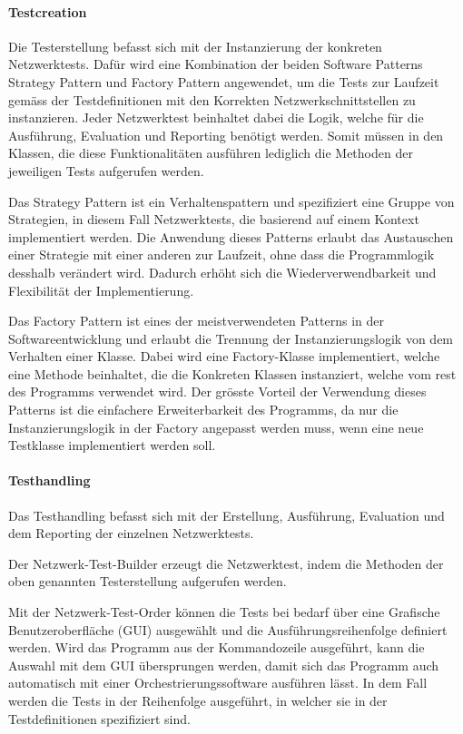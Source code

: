 \documentclass[]{subfiles}
\begin{document}
\newpage

\paragraph{Testcreation}
Die Testerstellung befasst sich mit der Instanzierung der konkreten Netzwerktests.
Dafür wird eine Kombination der beiden Software Patterns Strategy Pattern und Factory Pattern
angewendet, um die Tests zur Laufzeit gemäss der Testdefinitionen mit den Korrekten 
Netzwerkschnittstellen zu instanzieren. 
Jeder Netzwerktest beinhaltet dabei die Logik, welche für die Ausführung, Evaluation und 
Reporting benötigt werden. Somit müssen in den Klassen, die diese Funktionalitäten ausführen
lediglich die Methoden der jeweiligen Tests aufgerufen werden.

Das Strategy Pattern ist ein Verhaltenspattern und spezifiziert eine Gruppe von Strategien,
in diesem Fall Netzwerktests, die basierend auf einem Kontext implementiert werden.
Die Anwendung dieses Patterns erlaubt das Austauschen einer Strategie mit einer anderen
zur Laufzeit, ohne dass die Programmlogik desshalb verändert wird.
Dadurch erhöht sich die Wiederverwendbarkeit und Flexibilität der Implementierung.

Das Factory Pattern ist eines der meistverwendeten Patterns in der Softwareentwicklung und
erlaubt die Trennung der Instanzierungslogik von dem Verhalten einer Klasse.
Dabei wird eine Factory-Klasse implementiert, welche eine Methode beinhaltet, die die
Konkreten Klassen instanziert, welche vom rest des Programms verwendet wird.
Der grösste Vorteil der Verwendung dieses Patterns ist die einfachere Erweiterbarkeit des
Programms, da nur die Instanzierungslogik in der Factory angepasst werden muss, wenn eine 
neue Testklasse implementiert werden soll.

\paragraph{Testhandling}
Das Testhandling befasst sich mit der Erstellung, Ausführung, Evaluation und dem Reporting
der einzelnen Netzwerktests.

Der Netzwerk-Test-Builder erzeugt die Netzwerktest, indem die Methoden der oben genannten
Testerstellung aufgerufen werden. 

Mit der Netzwerk-Test-Order können die Tests bei bedarf über eine Grafische 
Benutzeroberfläche (GUI) ausgewählt und die Ausführungsreihenfolge definiert werden.
Wird das Programm aus der Kommandozeile ausgeführt, kann die Auswahl mit dem GUI
übersprungen werden, damit sich das Programm auch automatisch mit einer 
Orchestrierungssoftware ausführen lässt. 
In dem Fall werden die Tests in der Reihenfolge ausgeführt, in welcher sie in der 
Testdefinitionen spezifiziert sind. 
\end{document}

